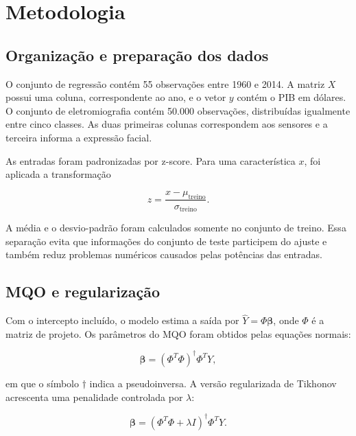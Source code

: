 \documentclass[conference]{IEEEtran}
\begin{document}
\section{Metodologia}

\subsection{Organização e preparação dos dados}

O conjunto de regressão contém 55 observações entre 1960 e 2014. A matriz $X$
possui uma coluna, correspondente ao ano, e o vetor $y$ contém o PIB em dólares.
O conjunto de eletromiografia contém 50.000 observações, distribuídas igualmente
entre cinco classes. As duas primeiras colunas correspondem aos sensores e a
terceira informa a expressão facial.

As entradas foram padronizadas por z-score. Para uma característica $x$, foi
aplicada a transformação

\begin{equation}
z = \frac{x-\mu_{\mathrm{treino}}}{\sigma_{\mathrm{treino}}}.
\label{eq:zscore}
\end{equation}

A média e o desvio-padrão foram calculados somente no conjunto de treino. Essa
separação evita que informações do conjunto de teste participem do ajuste e
também reduz problemas numéricos causados pelas potências das entradas.

\subsection{MQO e regularização}

Com o intercepto incluído, o modelo estima a saída por
$\hat{Y}=\Phi\boldsymbol{\beta}$, onde $\Phi$ é a matriz de projeto. Os parâmetros
do MQO foram obtidos pelas equações normais:

\begin{equation}
\boldsymbol{\beta} =
(\Phi^{T}\Phi)^{\dagger}\Phi^{T}Y,
\label{eq:mqo}
\end{equation}

em que o símbolo $\dagger$ indica a pseudoinversa. A versão regularizada de
Tikhonov acrescenta uma penalidade controlada por $\lambda$:

\begin{equation}
\boldsymbol{\beta} =
(\Phi^{T}\Phi+\lambda I)^{\dagger}\Phi^{T}Y.
\label{eq:ridge}
\end{equation}
\end{document}
